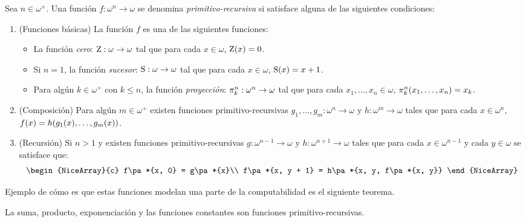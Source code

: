 \begin{definition}
	\label{def: funciones_primitivas}
	Sea $n\in\omega^{+}$. Una función $f:\omega^{n}\to\omega$ se denomina \emph{primitivo-recursiva} si satisface alguna de las siguientes condiciones:

	\begin{enumerate}
		\item (Funciones básicas) La función $f$ es una de las siguientes funciones:

		\begin{itemize}
			\item La función \emph{cero}: $\CERO:\omega\to\omega$ tal que para cada $x\in\omega$, $\CERO\pa*{x} = 0$.
			\item Si $n = 1$, la función \emph{sucesor}: $\SUCESOR:\omega\to\omega$ tal que para cada $x\in\omega$, $\SUCESOR\pa*{x} = x + 1$.
			\item Para algún $k\in\omega^{+}$ con $k\leq n$, la función \emph{proyección}: $\PROYECCION{n}{k}:\omega^{n}\to\omega$ tal que para cada $x_{1},\dotsc, x_{n}\in\omega$, $\PROYECCION{n}{k}\pa*{x_{1},\dotsc, x_{n}} = x_{k}$.
		\end{itemize}

		\item (Composición) Para algún $m\in\omega^{+}$ existen funciones primitivo-recursivas $g_{1},\dotsc, g_{m}:\omega^{n}\to\omega$ y $h:\omega^{m}\to\omega$ tales que para cada $x\in\omega^{n}$, $f\pa*{x} = h\pa*{g_{1}\pa*{x},\dotsc, g_{m}\pa*{x}}$.
		\item (Recursión) Si $n > 1$ y existen funciones primitivo-recursivas $g:\omega^{n - 1}\to\omega$ y $h:\omega^{n + 1}\to\omega$ tales que para cada $x\in\omega^{n - 1}$ y cada $y\in\omega$ se satisface que:
		\[
			\begin{NiceArray}{c}
				f\pa*{x, 0} = g\pa*{x}\\
				f\pa*{x, y + 1} = h\pa*{x, y, f\pa*{x, y}}
			\end{NiceArray}
		\]
	\end{enumerate}
\end{definition}

Ejemplo de cómo es que estas funciones modelan una parte de la computabilidad es el siguiente teorema.

\begin{theorem}
	\label{theo: suma_producto_primitivas} %
	La suma, producto, exponenciación y las funciones constantes son funciones primitivo-recursivas.
\end{theorem}

